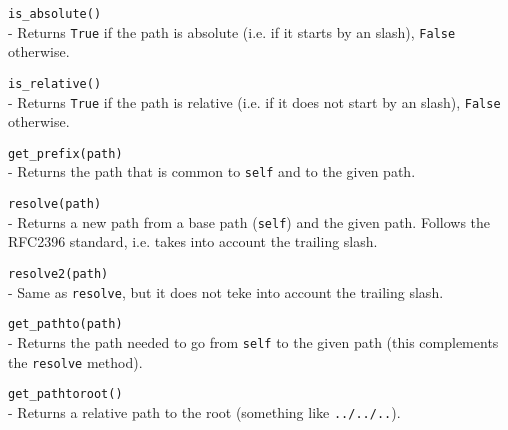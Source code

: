 \begin{api}
  {\tt is\_absolute()}\\
  - Returns {\tt True} if the path is absolute (i.e. if it starts by an
  slash), {\tt False} otherwise.

  {\tt is\_relative()}\\
  - Returns {\tt True} if the path is relative (i.e. if it does not start
    by an slash), {\tt False} otherwise.

  {\tt get\_prefix(path)}\\
  - Returns the path that is common to {\tt self} and to the given path.

  {\tt resolve(path)}\\
  - Returns a new path from a base path ({\tt self}) and the given path.
  Follows the RFC2396 standard, i.e. takes into account the trailing slash.

  {\tt resolve2(path)}\\
  - Same as {\tt resolve}, but it does not teke into account the trailing
  slash.

  {\tt get\_pathto(path)}\\
  - Returns the path needed to go from {\tt self} to the given path (this
    complements the {\tt resolve} method).

  {\tt get\_pathtoroot()}\\
  - Returns a relative path to the root (something like {\tt ../../..}).
\end{api}

